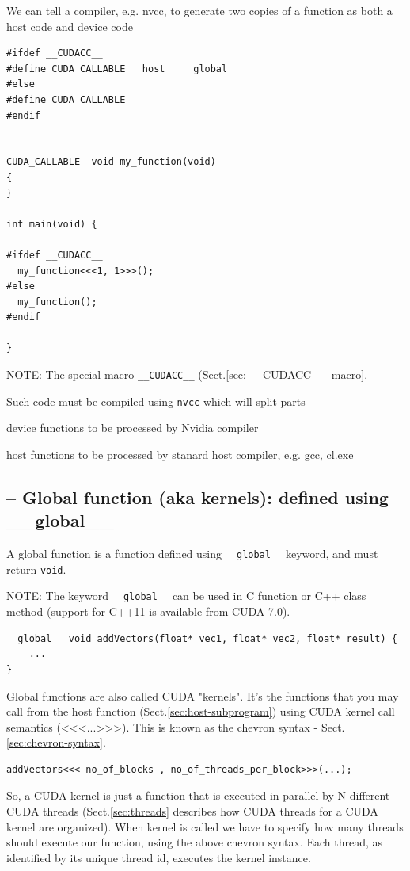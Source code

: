 We can tell a compiler, e.g. nvcc, to generate two copies of a function as both a host code and device code 
\begin{verbatim}
#ifdef __CUDACC__
#define CUDA_CALLABLE __host__ __global__
#else
#define CUDA_CALLABLE
#endif


CUDA_CALLABLE  void my_function(void)
{
}

int main(void) {

#ifdef __CUDACC__
  my_function<<<1, 1>>>();
#else
  my_function();
#endif

}
\end{verbatim}

NOTE: The special macro \verb!__CUDACC__! (Sect.\ref{sec:__CUDACC__-macro}.

Such code must be compiled using \verb!nvcc! which will split parts
\begin{enumerae}
  \item device functions to be processed by Nvidia compiler
  
  \item host functions to be processed by stanard host compiler, e.g. gcc, cl.exe
\end{enumerae}

\subsection{-- Global function (aka kernels): defined using \_\_global\_\_}
\label{sec:__global__functions}

A global function is a function defined using \verb!__global__! keyword, and must return \verb!void!.

NOTE: The keyword \verb!__global__! can be used in C function or C++ class
method (support for C++11 is available from CUDA 7.0).

\begin{verbatim}
__global__ void addVectors(float* vec1, float* vec2, float* result) {
    ...
}
\end{verbatim}
Global functions are also called CUDA "kernels". It's the functions that you may call
from the host function (Sect.\ref{sec:host-subprogram}) using CUDA kernel call semantics (<<<...>>>).
This is known as the chevron syntax - Sect.\ref{sec:chevron-syntax}.
\begin{verbatim}
addVectors<<< no_of_blocks , no_of_threads_per_block>>>(...);
\end{verbatim}

So, a CUDA kernel is just a function that is executed in parallel by N different
CUDA threads (Sect.\ref{sec:threads} describes how CUDA threads for a CUDA
kernel are organized). When kernel is called we have to specify how many threads
should execute our function, using the above chevron syntax. Each thread, as
identified by its unique thread id, executes the kernel instance.


